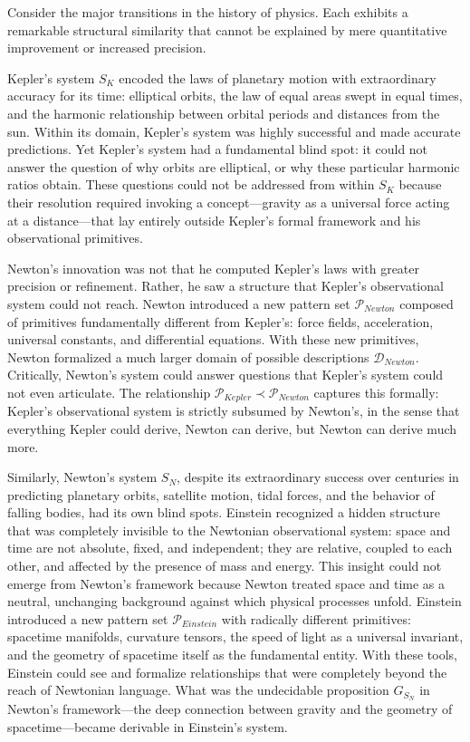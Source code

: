\documentclass[11pt]{article}
\begin{document}
Consider the major transitions in the history of physics. Each exhibits a remarkable structural similarity that cannot be explained by mere quantitative improvement or increased precision.

Kepler's system $S_K$ encoded the laws of planetary motion with extraordinary accuracy for its time: elliptical orbits, the law of equal areas swept in equal times, and the harmonic relationship between orbital periods and distances from the sun. Within its domain, Kepler's system was highly successful and made accurate predictions. Yet Kepler's system had a fundamental blind spot: it could not answer the question of why orbits are elliptical, or why these particular harmonic ratios obtain. These questions could not be addressed from within $S_K$ because their resolution required invoking a concept—gravity as a universal force acting at a distance—that lay entirely outside Kepler's formal framework and his observational primitives.

Newton's innovation was not that he computed Kepler's laws with greater precision or refinement. Rather, he saw a structure that Kepler's observational system could not reach. Newton introduced a new pattern set $\mathcal{P}_{Newton}$ composed of primitives fundamentally different from Kepler's: force fields, acceleration, universal constants, and differential equations. With these new primitives, Newton formalized a much larger domain of possible descriptions $\mathcal{D}_{Newton}$. Critically, Newton's system could answer questions that Kepler's system could not even articulate. The relationship $\mathcal{P}_{Kepler} \prec \mathcal{P}_{Newton}$ captures this formally: Kepler's observational system is strictly subsumed by Newton's, in the sense that everything Kepler could derive, Newton can derive, but Newton can derive much more.

Similarly, Newton's system $S_N$, despite its extraordinary success over centuries in predicting planetary orbits, satellite motion, tidal forces, and the behavior of falling bodies, had its own blind spots. Einstein recognized a hidden structure that was completely invisible to the Newtonian observational system: space and time are not absolute, fixed, and independent; they are relative, coupled to each other, and affected by the presence of mass and energy. This insight could not emerge from Newton's framework because Newton treated space and time as a neutral, unchanging background against which physical processes unfold. Einstein introduced a new pattern set $\mathcal{P}_{Einstein}$ with radically different primitives: spacetime manifolds, curvature tensors, the speed of light as a universal invariant, and the geometry of spacetime itself as the fundamental entity. With these tools, Einstein could see and formalize relationships that were completely beyond the reach of Newtonian language. What was the undecidable proposition $G_{S_N}$ in Newton's framework—the deep connection between gravity and the geometry of spacetime—became derivable in Einstein's system.
\end{document}
